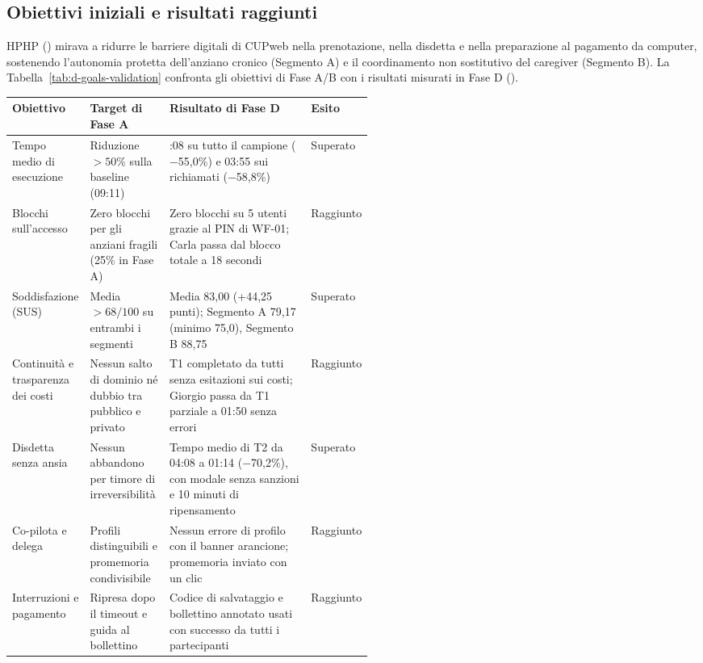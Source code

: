 \label{doc:d:04}

\subsection{Obiettivi iniziali e risultati raggiunti}

HPHP () mirava a ridurre le barriere digitali di CUPweb nella prenotazione, nella disdetta e nella preparazione al pagamento da computer, sostenendo l'autonomia protetta dell'anziano cronico (Segmento A) e il coordinamento non sostitutivo del caregiver (Segmento B). La Tabella~\ref{tab:d-goals-validation} confronta gli obiettivi di Fase A/B con i risultati misurati in Fase D ().

\begin{center}
\label{tab:d-goals-validation}
\footnotesize
\setlength{\tabcolsep}{3.5pt}
\begin{tabularx}{\linewidth}{@{}>{\raggedright\arraybackslash}p{0.2\linewidth} >{\raggedright\arraybackslash}p{0.22\linewidth} >{\raggedright\arraybackslash}X >{\centering\arraybackslash}p{0.1\linewidth}@{}}
\toprule
\textbf{Obiettivo} & \textbf{Target di Fase A} & \textbf{Risultato di Fase D} & \textbf{Esito} \\
\midrule
Tempo medio di esecuzione & Riduzione $> 50\%$ sulla baseline (09:11) & 04:08 su tutto il campione ($-$55,0\%) e 03:55 sui richiamati ($-$58,8\%) & Superato \\
\addlinespace[2pt]
Blocchi sull'accesso & Zero blocchi per gli anziani fragili (25\% in Fase A) & Zero blocchi su 5 utenti grazie al PIN di WF-01; Carla passa dal blocco totale a 18 secondi & Raggiunto \\
\addlinespace[2pt]
Soddisfazione (SUS) & Media $> 68/100$ su entrambi i segmenti & Media 83,00 (+44,25 punti); Segmento A 79,17 (minimo 75,0), Segmento B 88,75 & Superato \\
\addlinespace[2pt]
Continuità e trasparenza dei costi & Nessun salto di dominio né dubbio tra pubblico e privato & T1 completato da tutti senza esitazioni sui costi; Giorgio passa da T1 parziale a 01:50 senza errori & Raggiunto \\
\addlinespace[2pt]
Disdetta senza ansia & Nessun abbandono per timore di irreversibilità & Tempo medio di T2 da 04:08 a 01:14 ($-$70,2\%), con modale senza sanzioni e 10 minuti di ripensamento & Superato \\
\addlinespace[2pt]
Co-pilota e delega & Profili distinguibili e promemoria condivisibile & Nessun errore di profilo con il banner arancione; promemoria inviato con un clic & Raggiunto \\
\addlinespace[2pt]
Interruzioni e pagamento & Ripresa dopo il timeout e guida al bollettino & Codice di salvataggio e bollettino annotato usati con successo da tutti i partecipanti & Raggiunto \\
\bottomrule
\end{tabularx}
\end{center}

